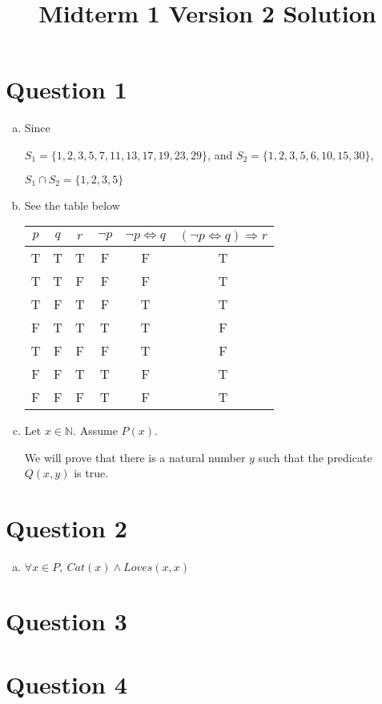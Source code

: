 \documentclass[12pt]{article}
\begin{document}
\title{Midterm 1 Version 2 Solution}
\maketitle

\section*{Question 1}
\begin{enumerate}[a.]
    \item

    Since

    $S_1 = \{1,2,3,5,7,11,13,17,19,23,29\}$, and $S_2 = \{1,2,3,5,6,10,15,30\}$,

    $S_1 \cap S_2 = \{1,2,3,5\}$

    \item

    See the table below

    \begin{tabular}{c|c|c|c|c|c}
        $p$ & $q$ & $r$ & $\neg p$ & $\neg p \Leftrightarrow q$ & $(\neg p \Leftrightarrow q) \Rightarrow r$\\
        \hline
        T & T & T & F & F & T\\
        \hline
        T & T & F & F & F & T\\
        \hline
        T & F & T & F & T & T\\
        \hline
        F & T & T & T & T & F\\
        \hline
        T & F & F & F & T & F\\
        \hline
        F & F & T & T & F & T\\
        \hline
        F & F & F & T & F & T
    \end{tabular}

    \item

    Let $x \in \mathbb{N}$. Assume $P(x)$.

    \bigskip

    We will prove that there is a natural number $y$ such that the predicate
    $Q(x,y)$ is true.

\end{enumerate}

\section*{Question 2}
\begin{enumerate}[a.]
    \item

    $\forall x \in P,\:Cat(x) \land Loves(x,x)$
\end{enumerate}

\section*{Question 3}

\section*{Question 4}
\end{document}

